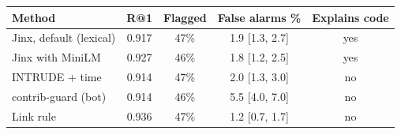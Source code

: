 \begin{tabular}{@{}lcccc@{}}\toprule
Method & R@1 & Flagged & False alarms \% & Explains code \\\midrule
\rowcolor{jinxrow}Jinx, default (lexical) & 0.917 & 47\% & 1.9 [1.3, 2.7] & yes \\
Jinx with MiniLM & 0.927 & 46\% & 1.8 [1.2, 2.5] & yes \\
INTRUDE + time & 0.914 & 47\% & 2.0 [1.3, 3.0] & no \\
contrib-guard (bot) & 0.914 & 46\% & 5.5 [4.0, 7.0] & no \\
Link rule & 0.936 & 47\% & 1.2 [0.7, 1.7] & no \\
\bottomrule\end{tabular}
